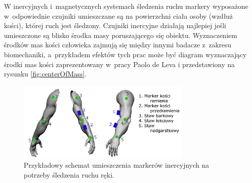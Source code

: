 W inercyjnych i~magnetycznych systemach śledzenia ruchu markery wyposażone w~odpowiednie czujniki umieszczane są na powierzchni ciała osoby (wzdłuż kości), której ruch jest śledzony. Czujniki inercyjne działają najlepiej jeśli umieszczone są blisko środka masy poruszającego się obiektu. Wyznaczeniem środków mas kości człowieka zajmują się między innymi badacze z~zakresu biomechaniki, a~przykładem efektów tych prac może być diagram wyznaczający środki mas kości zaprezentowany w~pracy Paolo de Leva \cite{DeLeva1996} i przedstawiony na rysunku \ref{fig:centerOfMass}.\\
																					
\begin{savenotes}
	\begin{figure}[!htp]
		\centering	
		\includegraphics[width=0.75\textwidth]{images/imuArm.png}
		\caption{Przykładowy schemat umieszczenia markerów inercyjnych na potrzeby śledzenia ruchu ręki.}
		\label{fig:literature:imuMarkerPlacementSample}
	\end{figure}
\end{savenotes}
																							
